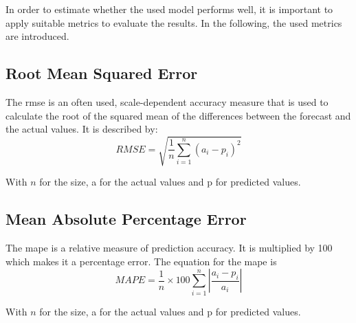 In order to estimate whether the used model performs well, it is important to apply suitable metrics to evaluate the results. In the following, the used metrics are introduced.\\

\subsection{Root Mean Squared Error}

The \gls{rmse} is an often used, scale-dependent accuracy measure that is used to calculate the root of the squared mean of the differences between the forecast and the actual values. It is described by:\\

\begin{equation}
RMSE = \sqrt{\frac{1}{n} \sum_{i=1}^{n} (a_i-p_i)^2}
\label{eq:rmse}
\end{equation}

With $n$ for the size, a for the actual values and p for predicted values.\\

\subsection{Mean Absolute Percentage Error}

The \gls{mape} is a relative measure of prediction accuracy. It is multiplied by 100 which makes it a percentage error. The equation for the \gls{mape} is\\

\begin{equation}
MAPE = \frac{1}{n}\times 100 \sum_{i=1}^{n} \left|\frac{a_i-p_i}{a_i}\right|
\label{eq:mape}
\end{equation}

With $n$ for the size, a for the actual values and p for predicted values.\\





%
%
%

